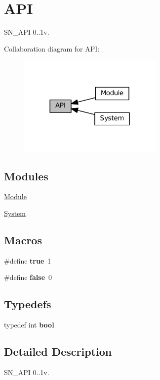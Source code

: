 \hypertarget{group__API}{}\section{A\+PI}
\label{group__API}


S\+N\+\_\+\+A\+PI 0..\+1v.  


Collaboration diagram for A\+PI\+:\nopagebreak
\begin{figure}[H]
\begin{center}
\leavevmode
\includegraphics[width=201pt]{group__API}
\end{center}
\end{figure}
\subsection*{Modules}
\begin{DoxyCompactItemize}
\item 
\hyperlink{group__MODULE}{Module}
\item 
\hyperlink{group__SYSTEM}{System}
\end{DoxyCompactItemize}
\subsection*{Macros}
\begin{DoxyCompactItemize}
\item 
\mbox{\label{group__API_ga41f9c5fb8b08eb5dc3edce4dcb37fee7}} 
\#define {\bfseries true}~1
\item 
\mbox{\label{group__API_ga65e9886d74aaee76545e83dd09011727}} 
\#define {\bfseries false}~0
\end{DoxyCompactItemize}
\subsection*{Typedefs}
\begin{DoxyCompactItemize}
\item 
\mbox{\label{group__API_ga1062901a7428fdd9c7f180f5e01ea056}} 
typedef int {\bfseries bool}
\end{DoxyCompactItemize}


\subsection{Detailed Description}
S\+N\+\_\+\+A\+PI 0..\+1v. 

